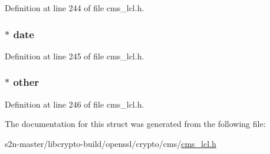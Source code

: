 Definition at line 244 of file cms\+\_\+lcl.\+h.

\subsubsection[{\texorpdfstring{date}{date}}]{$\ast$ date}\hypertarget{struct_c_m_s___recipient_key_identifier__st_a8dac4347fb9055f16f81837db490d51a}{}\label{struct_c_m_s___recipient_key_identifier__st_a8dac4347fb9055f16f81837db490d51a}


Definition at line 245 of file cms\+\_\+lcl.\+h.

\subsubsection[{\texorpdfstring{other}{other}}]{$\ast$ other}\hypertarget{struct_c_m_s___recipient_key_identifier__st_a75d0a1d8882aba95c23c4e0e11debc48}{}\label{struct_c_m_s___recipient_key_identifier__st_a75d0a1d8882aba95c23c4e0e11debc48}


Definition at line 246 of file cms\+\_\+lcl.\+h.



The documentation for this struct was generated from the following file\+:\begin{DoxyCompactItemize}
\item 
s2n-\/master/libcrypto-\/build/openssl/crypto/cms/\hyperlink{cms__lcl_8h}{cms\+\_\+lcl.\+h}\end{DoxyCompactItemize}
